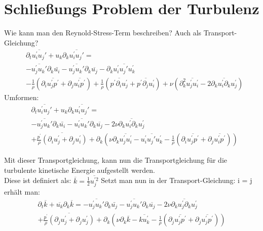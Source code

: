 \documentclass[11pt,t]{beamer}
\newcommand*\mean[1]{\overline{#1}}
\begin{document}
\section{Schließungs Problem der Turbulenz}
\begin{frame}
Wie kann man den Reynold-Stress-Term beschreiben? Auch als Transport-Gleichung?
\begin{align*}
&\partial_t\overline{u_i^{'}u_j{'}}+u_k\partial_k\overline{u_i^{'}u_j{'}} =\\& -\overline{u_j^{'}u_k{'}}\partial_k\bar{u_i}
-\overline{u_j^{'}u_k{'}}\partial_k\overline{u_j}-\partial_k\overline{u_i^{'}u_j{'}u_k^{'}} \\&- \frac{1}{\rho}(\partial_i\overline{u_j^{'}p^{'}}+\partial_j\overline{u_i^{'}p^{'}})+\frac{1}{\rho}(\overline{p^{'}\partial_iu_j^{'}}+\overline{p^{'}\partial_ju_i^{'}})+\nu(\partial_k^{2}\overline{u_j^{'}u_i^{'}}-2\overline{\partial_ku_i^{'}\partial_ku_j^{'}})
\end{align*}
Umformen:
\begin{align*}
&\partial_t\overline{u_i^{'}u_j{'}}+u_k\partial_k\overline{u_i^{'}u_j{'}} =\\& -\overline{u_j^{'}u_k{'}}\partial_k\bar{u_i}
-\overline{u_i^{'}u_k{'}}\partial_k\overline{u_j}- 2\nu\overline{\partial_ku_i^{'}\partial_ku_j^{'}}\\&+\overline{\frac{p^{'}}{\rho}(\partial_iu_j^{'}+\partial_ju_i^{'})}+\partial_k (\nu\partial_k\overline{u_j^{'}u_i^{'}} -\overline{u_i^{'}u_j{'}u_k^{'}}-\frac{1}{\rho}(\partial_i\overline{u_j^{'}p^{'}}+\partial_j\overline{u_i^{'}p^{'}}))
\end{align*}
\end{frame}
\begin{frame}
Mit dieser Transportgleichung, kann nun die Transportgleichung für die turbulente kinetische Energie aufgestellt werden.\\
Diese ist definiert als: $\mean{k} = \frac{1}{2}\mean{u_j^{'2}}$
Setzt man nun in der Transport-Gleichung: i = j erhält man:
\begin{align*}
\partial_t \mean{k} + \mean{u_k}\partial_k \mean{k} = -\overline{u_j^{'}u_k{'}}\partial_k\bar{u_j}
-\overline{u_j^{'}u_k{'}}\partial_k\overline{u_j}- 2\nu\overline{\partial_ku_j^{'}\partial_ku_j^{'}}\\+\overline{\frac{p^{'}}{\rho}(\partial_ju_j^{'}+\partial_ju_j^{'})}+\partial_k (\nu\partial_k\overline{k} -\overline{k u_k^{'}}-\frac{1}{\rho}(\partial_j\overline{u_j^{'}p^{'}}+\partial_j\overline{u_j^{'}p^{'}}))
\end{align*}

\end{frame}
\end{document}
